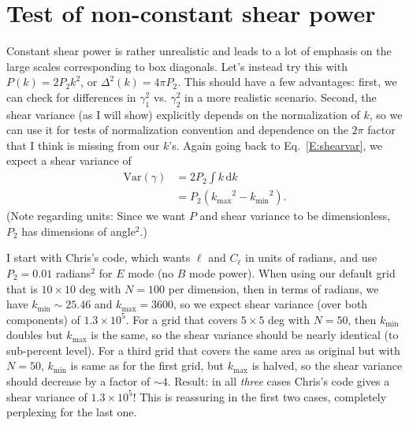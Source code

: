 \documentclass[preprint]{aastex}
\newcommand{\kmax}{\ensuremath{k_\mathrm{max}}}
\newcommand{\kmin}{\ensuremath{k_\mathrm{min}}}
\newcommand{\rmd}{\ensuremath{\mathrm{d}}}
\begin{document}
\section{Test of non-constant shear power}

Constant shear power is rather unrealistic and leads to a lot of
emphasis on the large scales corresponding to box diagonals.  Let's
instead try this with $P(k) = 2 P_2 k^2$, or $\Delta^2(k) =
4 \pi P_2$.  This should have a few advantages: first, we can check
for differences in $\gamma_1^2$ vs. $\gamma_2^2$ in a more realistic
scenario.  Second, the shear variance (as I will show) explicitly
depends on the normalization of $k$, so we can use it for tests of
normalization convention and dependence on the $2\pi$ factor that I
think is missing from our $k$'s. Again going back to Eq.~\ref{E:shearvar},
we expect a shear variance of
\begin{align}
\mathrm{Var}(\gamma) &= 2 P_2 \int k\,\rmd k\\
 &= P_2 (\kmax^2-\kmin^2).
\end{align}
(Note regarding units: Since we want $P$ and shear variance to be dimensionless, $P_2$
has dimensions of angle$^2$.)

I start with Chris's code, which wants $\ell$ and $C_\ell$ in units of
radians, and use $P_2=0.01$ radians$^2$ for $E$ mode (no $B$ mode power).  When
using our default grid that is $10\times 10$ deg with $N=100$ per
dimension, then in terms of radians, we have $\kmin\sim 25.46$ and
$\kmax=3600$, so we expect shear variance (over both components) of
$1.3\times 10^5$.  For a grid that covers $5\times 5$ deg with $N=50$,
then $\kmin$ doubles but $\kmax$ is the same, so the shear variance
should be nearly identical (to sub-percent level).  For a third grid
that covers the same area as original but with $N=50$, $\kmin$ is same
as for the first grid, but $\kmax$ is halved, so the shear variance
should decrease by a factor of $\sim 4$.  Result: in all {\em three}
cases Chris's code gives a shear variance of $1.3\times 10^5$!  This
is reassuring in the first two cases, completely perplexing for the
last one.
\end{document}
